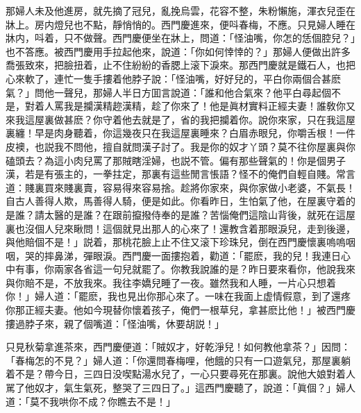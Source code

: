 那婦人未及他進房，就先摘了冠兒，亂挽烏雲，花容不整，朱粉懶施，渾衣兒歪在牀上。房内燈兒也不點，靜悄悄的。西門慶進來，便呌春梅，不應。只見婦人睡在牀内，呌着，只不做聲。西門慶便坐在牀上，問道：「怪油嘴，你怎的恁個腔兒？」也不答應。被西門慶用手拉起他來，說道：「你如何悻悻的？」那婦人便做出許多喬張致來，把臉扭着，止不住紛紛的香腮上滚下淚來。那西門慶就是鐵石人，也把心來軟了，連忙一隻手摟着他脖子說：「怪油嘴，好好兒的，平白你兩個合甚麽氣？」問他一聲兒，那婦人半日方囬言說道：「誰和他合氣來？他平白尋起個不是，對着人罵我是攔漢精趂漢精，趁了你來了！他是眞材實料正經夫妻！誰敎你又來我這屋裏做甚麽？你守着他去就是了，省的我把攔着你。說你來家，只在我這屋裏纏！早是肉身聽着，你這幾夜只在我這屋裏睡來？白眉赤眼兒，你嚼舌根！一件皮襖，也説我不問他，擅自就問漢子討了。我是你的奴才丫頭？莫不往你屋裏與你磕頭去？為這小肉兒罵了那賊瞎淫婦，也説不管。偏有那些聲氣的！你是個男子漢，若是有張主的，一拳拄定，那裏有這些閒言悵語？怪不的俺們自輕自賤。常言道：賤裏買來賤裏賣，容易得來容易捨。趁將你家來，與你家做小老婆，不氣長！自古人善得人欺，馬善得人騎，便是如此。你看昨日，生怕氣了他，在屋裏守着的是誰？請太醫的是誰？在跟前攛撥侍奉的是誰？苦惱俺們這陰山背後，就死在這屋裏也沒個人兒來瞅問！這個就見出那人的心來了！還教含着那眼淚兒，走到後邊，與他賠個不是！」説着，那桃花臉上止不住又滚下珍珠兒，倒在西門慶懷裏嗚嗚咽咽，哭的摔鼻涕，彈眼淚。西門慶一面摟抱着，勸道：「罷麽，我的兒！我連日心中有事，你兩家各省這一句兒就罷了。你教我說誰的是？昨日要來看你，他說我來與你賠不是，不放我來。我往李嬌兒睡了一夜。雖然我和人睡，一片心只想着你！」婦人道：「罷麽，我也見出你那心來了。一味在我面上虚情假意，到了還疼你那正經夫妻。他如今現替你懷着孩子，俺們一根草兒，拿甚麽比他！」被西門慶摟過脖子來，親了個嘴道：「怪油嘴，休要胡説！」

只見秋菊拿進茶來，西門慶便道：「賊奴才，好乾淨兒！如何教他拿茶？」因問：「春梅怎的不見？」婦人道：「你還問春梅哩，他餓的只有一口遊氣兒，那屋裏躺着不是？帶今日，三四日没喫點湯水兒了，一心只要尋死在那裏。說他大娘對着人駡了他奴才，氣生氣死，整哭了三四日了。」這西門慶聽了，說道：「眞個？」婦人道：「莫不我哄你不成？你瞧去不是！」

